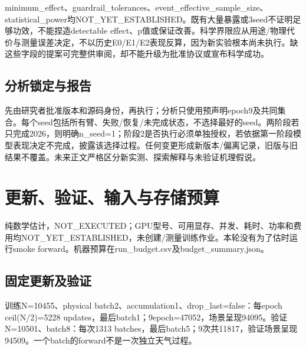 \documentclass[UTF8,fontset=fandol,10pt]{ctexart}
\begin{document}
minimum\_\allowbreak{}effect、guardrail\_\allowbreak{}tolerances、event\_\allowbreak{}effective\_\allowbreak{}sample\_\allowbreak{}size、statistical\_\allowbreak{}power均NOT\_\allowbreak{}YET\_\allowbreak{}ESTABLISHED。既有大量暴露或3seed不证明足够功效，不能捏造detectable effect、p值或保证改善。科学界限应从用途/\allowbreak{}物理代价与测量误差决定，不以历史E0/\allowbreak{}E1/\allowbreak{}E2表现反算，因为新实验根本尚未执行。缺这些字段的提案可完整供审阅，却不能升级为批准协议或宣布科学成功。

\subsection{分析锁定与报告}

先由研究者批准版本和源码身份，再执行；分析只使用预声明epoch9及共同集合。每个seed包括所有臂、失败/\allowbreak{}恢复/\allowbreak{}未完成状态，不选择最好的seed。两阶段若只完成2026，则明确n\_\allowbreak{}seed=1；阶段2是否执行必须单独授权，若依据第一阶段模型表现决定不完成，披露该选择过程。任何变更形成新版本/\allowbreak{}偏离记录，旧版与旧结果不覆盖。未来正文严格区分新实测、探索解释与未验证机理假说。
\clearpage\section{更新、验证、输入与存储预算}

纯数学估计，NOT\_\allowbreak{}EXECUTED；GPU型号、可用显存、并发、耗时、功率和费用均NOT\_\allowbreak{}YET\_\allowbreak{}ESTABLISHED，未创建/\allowbreak{}测量训练作业。本轮没有为了估时运行smoke forward。机器预算在run\_\allowbreak{}budget.csv及budget\_\allowbreak{}summary.json。

\subsection{固定更新及验证}

训练N=10455、physical batch2、accumulation1、drop\_\allowbreak{}last=false：每epoch ceil(N/\allowbreak{}2)=5228 updates，最后batch1；9epoch=47052，场景呈现94095。验证N=10501、batch8：每次1313 batches，最后batch5；9次共11817，验证场景呈现94509。一个batch的forward不是一次独立天气过程。
\end{document}
